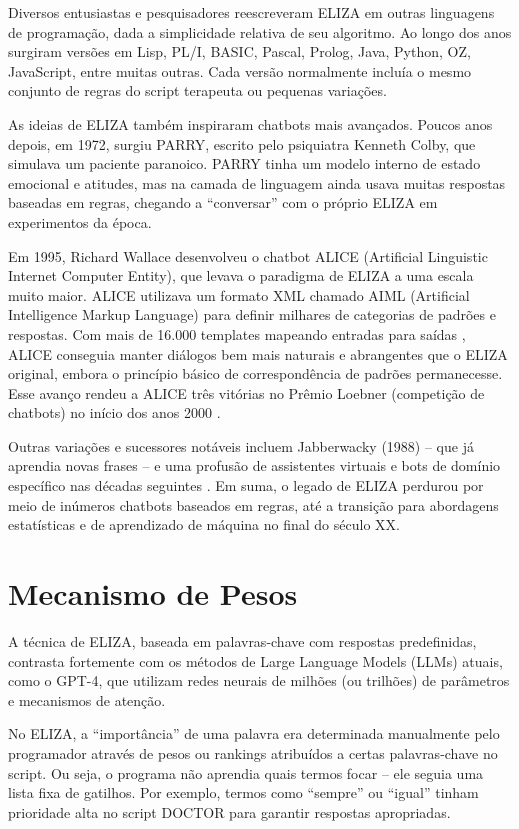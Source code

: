 \documentclass[14pt,a4paper,oneside]{book}
\begin{document}
Diversos entusiastas e pesquisadores reescreveram ELIZA em outras linguagens de programação, dada a simplicidade relativa de seu algoritmo. Ao longo dos anos surgiram versões em Lisp, PL/I, BASIC, Pascal, Prolog, Java, Python, OZ, JavaScript, entre muitas outras. Cada versão normalmente incluía o mesmo conjunto de regras do script terapeuta ou pequenas variações.

As ideias de ELIZA também inspiraram chatbots mais avançados. Poucos anos depois, em 1972, surgiu PARRY, escrito pelo psiquiatra Kenneth Colby, que simulava um paciente paranoico. PARRY tinha um modelo interno de estado emocional e atitudes, mas na camada de linguagem ainda usava muitas respostas baseadas em regras, chegando a “conversar” com o próprio ELIZA em experimentos da época.

Em 1995, Richard Wallace desenvolveu o chatbot ALICE (Artificial Linguistic Internet Computer Entity), que levava o paradigma de ELIZA a uma escala muito maior. ALICE utilizava um formato XML chamado AIML (Artificial Intelligence Markup Language) para definir milhares de categorias de padrões e respostas. Com mais de 16.000 templates mapeando entradas para saídas \cite{Wallace2000}, ALICE conseguia manter diálogos bem mais naturais e abrangentes que o ELIZA original, embora o princípio básico de correspondência de padrões permanecesse. Esse avanço rendeu a ALICE três vitórias no Prêmio Loebner (competição de chatbots) no início dos anos 2000 \cite{Wallace2000}.

Outras variações e sucessores notáveis incluem Jabberwacky (1988) – que já aprendia novas frases – e uma profusão de assistentes virtuais e bots de domínio específico nas décadas seguintes \cite{Wallace2000}. Em suma, o legado de ELIZA perdurou por meio de inúmeros chatbots baseados em regras, até a transição para abordagens estatísticas e de aprendizado de máquina no final do século XX.

\section{Mecanismo de Pesos}

A técnica de ELIZA, baseada em palavras-chave com respostas predefinidas, contrasta fortemente com os métodos de Large Language Models (LLMs) atuais, como o GPT-4, que utilizam redes neurais de milhões (ou trilhões) de parâmetros e mecanismos de atenção.

No ELIZA, a “importância” de uma palavra era determinada manualmente pelo programador através de pesos ou rankings atribuídos a certas palavras-chave no script. Ou seja, o programa não aprendia quais termos focar – ele seguia uma lista fixa de gatilhos. Por exemplo, termos como “sempre” ou “igual” tinham prioridade alta no script DOCTOR para garantir respostas apropriadas.
\end{document}
